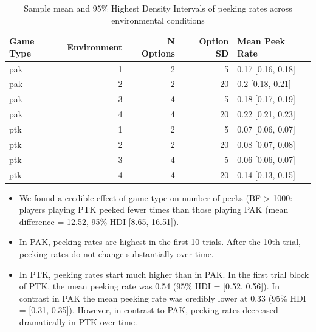 \documentclass[a4paper,doc,natbib,floatsintext]{apa6}\usepackage[]{graphicx}\usepackage[]{color}
\begin{document}
\begin{table}[ht]
\centering
\begin{tabular}{lrrrl}
  \hline
Game Type & Environment & N Options & Option SD & Mean Peek Rate \\ 
  \hline
pak &   1 &   2 &   5 & 0.17 [0.16, 0.18] \\ 
  pak &   2 &   2 &  20 & 0.2 [0.18, 0.21] \\ 
  pak &   3 &   4 &   5 & 0.18 [0.17, 0.19] \\ 
  pak &   4 &   4 &  20 & 0.22 [0.21, 0.23] \\ 
  ptk &   1 &   2 &   5 & 0.07 [0.06, 0.07] \\ 
  ptk &   2 &   2 &  20 & 0.08 [0.07, 0.08] \\ 
  ptk &   3 &   4 &   5 & 0.06 [0.06, 0.07] \\ 
  ptk &   4 &   4 &  20 & 0.14 [0.13, 0.15] \\ 
   \hline
\end{tabular}
\caption{Sample mean and 95\% Highest Density Intervals of peeking rates across environmental conditions} 
\label{table:peekdf}
\end{table}



\begin{itemize}

  \item We found a credible effect of game type on number of peeks (BF > 1000: players playing PTK peeked fewer times than those playing PAK (mean difference = 12.52, 95\% HDI [8.65, 16.51]).

  \item In PAK, peeking rates are highest in the first 10 trials. After the 10th trial, peeking rates do not change substantially over time.
  
  \item In PTK, peeking rates start much higher than in PAK. In the first trial block of PTK, the mean peeking rate was 0.54 (95\% HDI = [0.52, 0.56]). In contrast in PAK the mean peeking rate was credibly lower at 0.33 (95\% HDI = [0.31, 0.35]). However, in contrast to PAK, peeking rates decreased dramatically in PTK over time.


\end{itemize}

\end{document}
